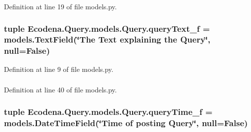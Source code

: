 Definition at line 19 of file models.py.

\hypertarget{class_ecodena_1_1_query_1_1models_1_1_query_a82f008f189f9a40b1bc97147e81ce7ed}{
\subsubsection[{queryText\_\-f}]{\setlength{\rightskip}{0pt plus 5cm}tuple {\bf Ecodena.Query.models.Query.queryText\_\-f} = models.TextField(\char`\"{}The Text explaining the {\bf Query}\char`\"{}, null=False)}}
\label{de/d81/class_ecodena_1_1_query_1_1models_1_1_query_a82f008f189f9a40b1bc97147e81ce7ed}


Definition at line 9 of file models.py.

\hypertarget{class_ecodena_1_1_query_1_1models_1_1_query_af6bf78442af5d30068c5ae9b7f0c48f2}{
\subsubsection[{queryTime\_\-f}]{}}
\label{de/d81/class_ecodena_1_1_query_1_1models_1_1_query_af6bf78442af5d30068c5ae9b7f0c48f2}


Definition at line 40 of file models.py.

\hypertarget{class_ecodena_1_1_query_1_1models_1_1_query_a69b4646a1bbc4d7dc831028df2f80bae}{
\subsubsection[{queryTime\_\-f}]{\setlength{\rightskip}{0pt plus 5cm}tuple {\bf Ecodena.Query.models.Query.queryTime\_\-f} = models.DateTimeField(\char`\"{}Time of posting {\bf Query}\char`\"{}, null=False)}}
\label{de/d81/class_ecodena_1_1_query_1_1models_1_1_query_a69b4646a1bbc4d7dc831028df2f80bae}


